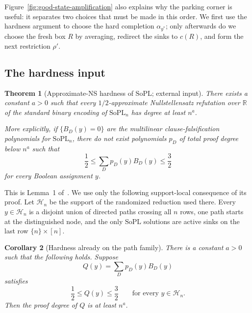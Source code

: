 \documentclass[11pt]{article}
\newtheorem{theorem}{Theorem}[section]
\newtheorem{corollary}[theorem]{Corollary}
\theoremstyle{definition}
\newcommand{\SoPL}{\mathrm{SoPL}}
\begin{document}
Figure~\ref{fig:good-state-amplification} also explains why the parking corner is useful:
it separates two choices that must be made in this order.  We first use the hardness
argument to choose the hard completion $\alpha_{y^*}$; only afterwards do we choose
the fresh box $R$ by averaging, redirect the sinks to $c(R)$, and form the next
restriction $\rho'$.

\subsection{The hardness input}

\begin{theorem}[Approximate-NS hardness of $\SoPL$; external input]\label{thm:sopl}
There exists a constant $a>0$ such that every $1/2$-approximate Nullstellensatz
refutation over $\mathbb R$ of the standard binary encoding of $\SoPL_n$ has degree
at least $n^a$.

More explicitly, if $\{B_D(y)=0\}$ are the multilinear clause-falsification
polynomials for $\SoPL_n$, there do not exist polynomials $p_D$ of total proof degree
below $n^a$ such that
\[
  \frac12\le \sum_D p_D(y)B_D(y)\le\frac32
\]
for every Boolean assignment $y$.
\end{theorem}

This is Lemma~1 of~\cite{GHJMPRT}.  We use only the following support-local
consequence of its proof.  Let $\mathcal H_n$ be the support of the randomized
reduction used there.  Every $y\in\mathcal H_n$ is a disjoint union of directed paths
crossing all $n$ rows, one path starts at the distinguished node, and the only
$\SoPL$ solutions are active sinks on the last row $\{n\}\times[n]$.

\begin{corollary}[Hardness already on the path family]\label{cor:sopl-path}
There is a constant $a>0$ such that the following holds.  Suppose
\[
  Q(y)=\sum_D p_D(y)B_D(y)
\]
satisfies
\[
  \frac12\le Q(y)\le\frac32
  \qquad\text{for every }y\in\mathcal H_n.
\]
Then the proof degree of $Q$ is at least $n^a$.
\end{corollary}
\end{document}
